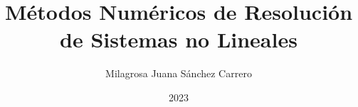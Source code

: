 \usepackage[T1]{fontenc}
\usepackage{bussproofs}
\usepackage[utf8]{inputenc}
\usepackage[english, spanish, es-noshorthands]{babel}
\usepackage{comment}


\usepackage{hyperref}
\usepackage{url}
\usepackage{epigraph}

\usepackage{tikz}
\usetikzlibrary{babel}
\usetikzlibrary{cd}
\usepackage{minted}

\usepackage{mathpazo}
\usepackage{algorithm}
\usepackage[noend]{algpseudocode}
\usepackage{svg}
\usepackage{amsmath}

\algrenewcommand{}
\algrenewcommand{}
\algrenewcommand{}
\algrenewcommand\algorithmicdo{\textbf{:}}
\algrenewcommand{}
\algrenewcommand{}
\algrenewcommand{}
\algrenewcommand{}
\renewcommand\thealgorithm{}
\usepackage{verbatim}


	
	\title{Métodos Numéricos de Resolución de Sistemas no Lineales}
	\author{Milagrosa Juana Sánchez Carrero}
	\date{2023}
	\newcommand{\tutores}[1]{\newcommand{\guardatutores}{#1}}
	\tutores{Prof. Tutor José Luis B. Trinidad}
	
	\makeatletter
	\makeatother
	
	\newenvironment{dedication}
	{\clearpage           %
		\thispagestyle{empty}%
		\vspace*{\stretch{1}}%
		\itshape             %
		\raggedleft          %
	}
	{\par %
		\vspace{\stretch{3}} %
		\clearpage           %
	}
	

